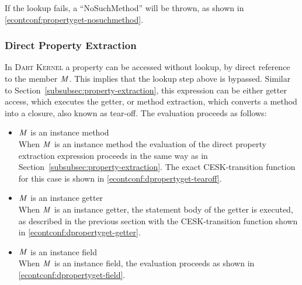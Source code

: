 \documentclass[a4paper,oneside,fleqn]{article}
\newcommand{\kernel}{\textsc{Dart Kernel}}
\begin{document}
If the lookup fails, a ``NoSuchMethod'' will be thrown, as shown in \eqref{econtconf:propertyget-nosuchmethod}.


\subsubsection{Direct Property Extraction}
\label{subsubsec:direct-property-extraction}

In \kernel{} a property can be accessed without lookup, by direct reference to the member $\mathit{M}$.
This implies that the lookup step above is bypassed.
Similar to Section~\ref{subsubsec:property-extraction}, this expression can be either getter access, which executes the getter, or method extraction, which converts a method into a closure, also known as tear-off.
The evaluation proceeds as follows:

\begin{itemize}
    \item $\mathit{M}$ is an instance method\\
        When $\mathit{M}$ is an instance method the evaluation of the direct property extraction expression proceeds in the same way as in Section~\ref{subsubsec:property-extraction}.
        The exact CESK-transition function for this case is shown in \eqref{econtconf:dpropertyget-tearoff}.

    \item $\mathit{M}$ is an instance getter\\
        When $\mathit{M}$ is an instance getter, the statement body of the getter is executed, as described in the previous section with the CESK-transition function shown in \eqref{econtconf:dpropertyget-getter}.

    \item $\mathit{M}$ is an instance field\\
        When $\mathit{M}$ is an instance field, the evaluation proceeds as shown in \eqref{econtconf:dpropertyget-field}.

\end{itemize}
\end{document}
